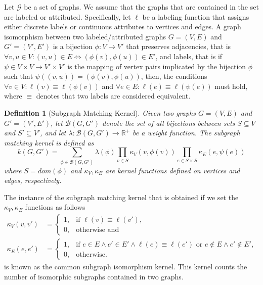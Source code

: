 \documentclass[twoside,11pt]{article}
\newtheorem{definition}{Definition}
\begin{document}
Let $\mathcal{G}$ be a set of graphs.
We assume that the graphs that are contained in the set are labeled or attributed.
Specifically, let $\ell$ be a labeling function that assigns either discrete labels or continuous attributes to vertices and edges.
A graph isomorphism between two labeled/attributed graphs $G=(V,E)$ and $G'=(V',E')$ is a bijection $\phi : V \rightarrow V'$ that preserves adjacencies, that is $\forall v,u \in V : (v,u) \in E \Leftrightarrow (\phi(v), \phi(u)) \in E'$, and labels, that is if $\psi \in V \times V \rightarrow V' \times V'$ is the mapping of vertex pairs implicated by the bijection $\phi$ such that $\psi((v,u)) = (\phi(v), \phi(u))$, then, the conditions $\forall v \in V : \ell(v) \equiv \ell(\phi(v))$ and $\forall e \in E : \ell(e) \equiv \ell(\psi(e))$ must hold, where $\equiv$ denotes that two labels are considered equivalent.

\begin{definition}[Subgraph Matching Kernel]
  Given two graphs $G=(V,E)$ and $G'=(V',E')$, let $\mathcal{B}(G,G')$ denote the set of all bijections between sets $S \subseteq V$ and $S' \subseteq V'$, and let $\lambda : \mathcal{B}(G,G') \rightarrow \mathbb{R}^+$ be a weight function.
  The subgraph matching kernel is defined as
  \begin{equation}
      k(G, G') = \sum_{\phi \in \mathcal{B}(G,G')} \lambda(\phi) \prod_{v \in S} \kappa_V(v, \phi(v)) \prod_{e \in S \times S} \kappa_E(e, \psi(e))
  \end{equation}
  where $S = dom(\phi)$ and $\kappa_V, \kappa_E$ are kernel functions defined on vertices and edges, respectively.
\end{definition}

The instance of the subgraph matching kernel that is obtained if we set the $\kappa_V, \kappa_E$ functions as follows
\begin{equation}
    \begin{split}
        \kappa_V(v,v') &= \begin{cases}
        1, & \text{if $\ell(v) \equiv \ell(v')$},\\
        0, & \text{otherwise and} 
        \end{cases}\\
        \kappa_E(e,e') &= \begin{cases}
        1, & \text{if $e \in E \wedge e' \in E' \wedge \ell(e) \equiv \ell(e')$ or $e \not \in E \wedge e' \not \in E'$},\\
        0, & \text{otherwise.}
        \end{cases}
    \end{split}
\end{equation}
is known as the common subgraph isomorphism kernel.
This kernel counts the number of isomorphic subgraphs contained in two graphs.
\end{document}
